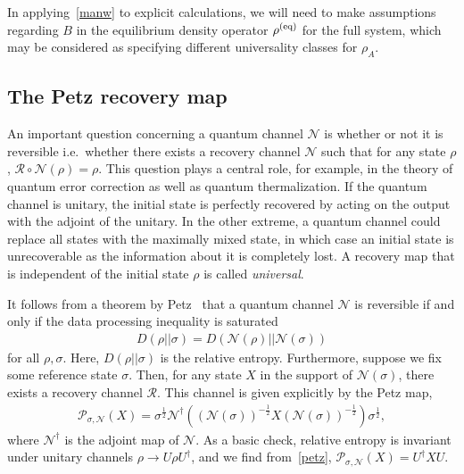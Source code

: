 \documentclass[a4paper,11pt]{article}
\newcommand\sig{\sigma}
\newcommand\da{{\dagger}}
\newcommand\sN{{\ensuremath{{\mathcal N}}}}
\newcommand\sR{{\mathcal R}}
\begin{document}
In applying~\eqref{manw} to explicit calculations, we will need to make assumptions regarding $B$ in the equilibrium density operator $\rho^{(\rm eq)}$ for the full system, which may be considered as specifying different universality classes for $\rho_A$. 




\subsection{The Petz recovery map}\label{sec:petz}


An important question concerning a quantum channel $\sN$ is whether or not it is reversible i.e.~whether there exists a recovery channel $\sN$ such that for any state $\rho$, $\sR \circ \sN (\rho) = \rho$. 
This question plays a central role, for example, in the theory of quantum error correction as well as quantum thermalization.
If the quantum channel is unitary, the initial state is perfectly recovered by acting on the output with the adjoint of the unitary. In the other extreme, a quantum channel could replace all states with the maximally mixed state, in which case an initial state is unrecoverable as the information about it is completely lost. A recovery map that is independent of the initial state $\rho$ is called \textit{universal}. 

It follows from a theorem by Petz~\cite{cmp/1104115260,10.1093/qmath/39.1.97,2003RvMaP..15...79P} that a quantum channel $\sN$ is reversible if and only if 
the data processing inequality is saturated
\begin{align}
 D(\rho\lvert \rvert \sigma) = D(\mathcal{N}(\rho)\lvert \rvert \mathcal{N}(\sigma))
\end{align}
for all $\rho, \sig$. Here, $ D(\rho\lvert \rvert \sigma) $ is the relative entropy. 
Furthermore, suppose we fix some reference state $\sigma$. Then, for any state $X$ in the support of $\sN(\sigma)$, there exists a recovery channel $\sR$. This channel is given explicitly by the Petz map, 
\begin{align}
 \mathcal{P}_{\sigma,\mathcal{N}}(X) = \sigma^{\frac{1}{2}} \mathcal{N}^{\dagger}\left((\mathcal{N}(\sigma))^{-\frac{1}{2}} X (\mathcal{N}(\sigma))^{-\frac{1}{2}}\right)\sigma^{\frac{1}{2}},
 \label{petz}
\end{align}
where $\mathcal{N}^{\dagger}$ is the adjoint map of $\sN$. As a basic check, relative entropy is invariant under unitary channels $\rho \to U \rho U^\da$, and we find from~\eqref{petz}, $ \mathcal{P}_{\sigma,\mathcal{N}}(X) = U^\da X U$. 
\end{document}
